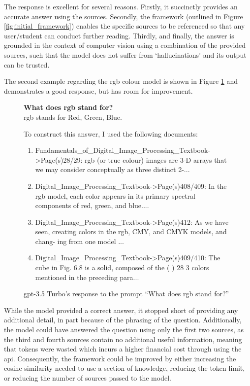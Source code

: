 The response is excellent for several reasons. Firstly, it succinctly provides an accurate answer using the sources. Secondly, the framework (outlined in Figure \ref{fig:initial_framework}) enables the specific sources to be referenced so that any user/student can conduct further reading. Thirdly, and finally, the answer is grounded in the context of computer vision using a combination of the provided sources, such that the model does not suffer from `hallucinations' and its output can be trusted.

The second example regarding the \acrshort{rgb} colour model is shown in Figure \ref{fig:results_gpt_ex2} and demonstrates a good response, but has room for improvement. 

\begin{figure}[h]
    \begin{itquote}
        \textbf{What does \acrshort{rgb} stand for?} \\ 
        \acrshort{rgb} stands for Red, Green, Blue.
        
        To construct this answer, I used the following documents:
           
        \begin{enumerate}
            \item Fundamentals\_of\_Digital\_Image\_Processing\_Textbook->Page(s)28/29:  \acrshort{rgb} (or true colour) images are 3-D arrays that we may consider conceptually as three  distinct 2-...
            \item Digital\_Image\_Processing\_Textbook->Page(s)408/409:  In the \acrshort{rgb} model, each color appears in its primary spectral components of red,   green, and blue....
            \item Digital\_Image\_Processing\_Textbook->Page(s)412:  As we have seen, creating colors in the \acrshort{rgb}, CMY, and CMYK models, and chang-   ing from one model ...
            \item Digital\_Image\_Processing\_Textbook->Page(s)409/410:  The cube in Fig. 6.8 is a solid, composed of the (  )  28 3 colors mentioned in the preceding para...
        \end{enumerate}
    \end{itquote}
    \caption{\acrshort{gpt}-3.5 Turbo's response to the prompt ``What does \acrshort{rgb} stand for?''}
    \label{fig:results_gpt_ex2}
\end{figure}

While the model provided a correct answer, it stopped short of providing any additional detail, in part because of the phrasing of the question. Additionally, the model could have answered the question using only the first two sources, as the third and fourth sources contain no additional useful information, meaning that tokens were wasted which incurs a higher financial cost through using the \acrshort{api}. Consequently, the framework could be improved by either increasing the cosine similarity needed to use a section of knowledge, reducing the token limit, or reducing the number of sources passed to the model.


